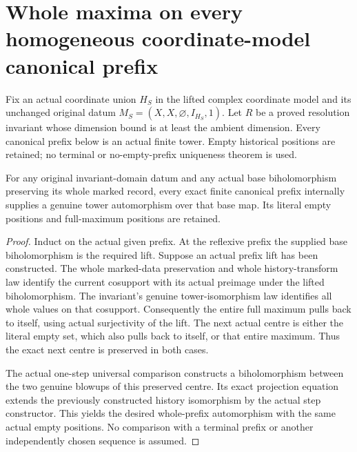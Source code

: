 \section{Whole maxima on every homogeneous coordinate-model canonical prefix}
\label{sec:hironaka-homogeneous-canonical-tower-maxima}

Fix an actual coordinate union $H_S$ in the lifted complex coordinate
model and its unchanged original datum $M_S=(X,X,\varnothing,I_{H_S},1)$.
Let $R$ be a proved resolution invariant whose dimension bound is at
least the ambient dimension. Every canonical prefix below is an actual
finite tower. Empty historical positions are retained; no terminal or
no-empty-prefix uniqueness theorem is used.

\begin{theorem}
\label{hir:homogeneous-exact-canonical-prefix-automorphism-lift}
For any original invariant-domain datum and any actual base
biholomorphism preserving its whole marked record, every exact finite
canonical prefix internally supplies a genuine tower automorphism over
that base map. Its literal empty positions and full-maximum positions
are retained.
\leanok
{}
\end{theorem}
\begin{proof}
Induct on the actual given prefix. At the reflexive prefix the supplied
base biholomorphism is the required lift. Suppose an actual prefix lift
has been constructed. The whole marked-data preservation and whole
history-transform law identify the current cosupport with its actual
preimage under the lifted biholomorphism. The invariant's genuine
tower-isomorphism law identifies all whole values on that cosupport.
Consequently the entire full maximum pulls back to itself, using actual
surjectivity of the lift. The next actual centre is either the literal
empty set, which also pulls back to itself, or that entire maximum.
Thus the exact next centre is preserved in both cases.

The actual one-step universal comparison constructs a biholomorphism
between the two genuine blowups of this preserved centre. Its exact
projection equation extends the previously constructed history
isomorphism by the actual step constructor. This yields the desired
whole-prefix automorphism with the same actual empty positions. No
comparison with a terminal prefix or another independently chosen
sequence is assumed.
\end{proof}

